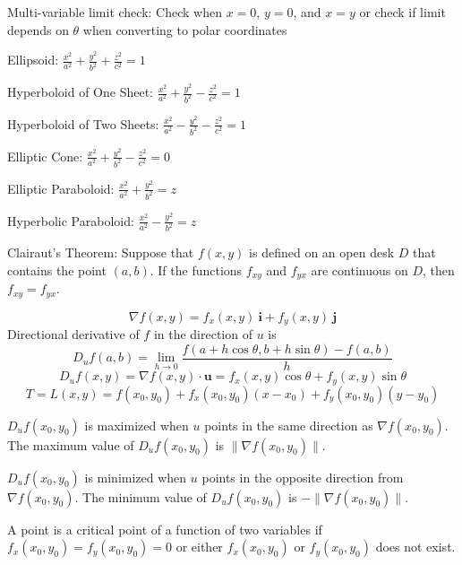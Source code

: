 \documentclass{article}
\begin{document}
Multi-variable limit check: Check when $x=0$, $y=0$, and $x=y$ or check if limit depends on $\theta$ when converting to polar coordinates
\vspace{1em}

Ellipsoid: $\frac{x^2}{a^2} + \frac{y^2}{b^2} + \frac{z^2}{c^2} = 1$
\vspace{1em}

Hyperboloid of One Sheet: $\frac{x^2}{a^2} + \frac{y^2}{b^2} - \frac{z^2}{c^2} = 1$
\vspace{1em}

Hyperboloid of Two Sheets: $\frac{x^2}{a^2} - \frac{y^2}{b^2} - \frac{z^2}{c^2} = 1$
\vspace{1em}

Elliptic Cone: $\frac{x^2}{a^2} + \frac{y^2}{b^2} - \frac{z^2}{c^2} = 0$
\vspace{1em}

Elliptic Paraboloid: $\frac{x^2}{a^2} + \frac{y^2}{b^2} = z$
\vspace{1em}

Hyperbolic Paraboloid: $\frac{x^2}{a^2} - \frac{y^2}{b^2} = z$
\vspace{1em}

Clairaut's Theorem: Suppose that $f(x, y)$ is defined on an open desk $D$ that contains the point $(a, b)$. If the functions $f_{xy}$ and $f_{yx}$ are continuous on $D$, then $f_{xy}=f_{yx}$.

\[\nabla f(x,y)=f_x(x,y)\:\mathbf{i}+f_y(x,y)\:\mathbf{j}\]
Directional derivative of $f$ in the direction of $u$ is
\[D_u f(a, b)=\lim_{h\rightarrow 0}\frac{f(a+h\cos\theta, b+h\sin\theta)-f(a,b)}{h}\]
\[D_u f(x, y) = \nabla f(x,y)\cdot\mathbf{u} = f_x(x, y)\cos\theta + f_y(x,y)\sin\theta\]
\[T=L(x,y)=f(x_0,y_0)+f_x(x_0,y_0)(x-x_0)+f_y(x_0,y_0)(y-y_0)\]

$D_u f(x_0, y_0)$ is maximized when $u$ points in the same direction as $\nabla f(x_0, y_0)$. The maximum value of $D_u f(x_0, y_0)$ is $\|\nabla f(x_0, y_0)\|$.
\vspace{0em}

$D_u f(x_0, y_0)$ is minimized when $u$ points in the opposite direction from $\nabla f(x_0, y_0)$. The minimum value of $D_u f(x_0, y_0)$ is $-\|\nabla f(x_0, y_0)\|$.
\vspace{1em}

A point is a critical point of a function of two variables if $f_x(x_0,y_0)=f_y(x_0,y_0)=0$ or either $f_x(x_0,y_0)$ or $f_y(x_0,y_0)$ does not exist.
\vspace{1em}
\end{document}
